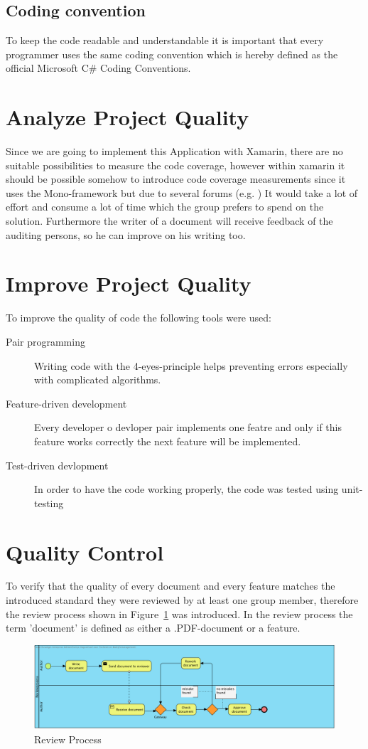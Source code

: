 \documentclass[12pt]{article}
\begin{document}
		\subsection{Coding convention}
		To keep the code readable and understandable it is important that every programmer uses the same coding convention which is hereby defined as the official Microsoft C\# Coding Conventions. \cite{Microsoft}
		
		\section{Analyze Project Quality}
		Since we are going to implement this Application with Xamarin, there are no suitable possibilities to measure the code coverage, however within xamarin it should be possible somehow to introduce code coverage measurements since it uses the Mono-framework but due to several forums (e.g. \cite{CodeCoverage}) It would take a lot of effort and consume a lot of time which the group prefers to spend on the solution. Furthermore the writer of a document will receive feedback of the auditing persons, so he can improve on his writing too.
		\clearpage
		\section{Improve Project Quality}
		To improve the quality of code the following tools were used:
		\begin{description}
			\item[Pair programming] Writing code with the 4-eyes-principle helps preventing errors especially with complicated algorithms.
			\item[Feature-driven development] Every developer o devloper pair implements one featre and only if this feature works correctly the next feature will be implemented.
			\item[Test-driven devlopment] In order to have the code working properly, the code was tested using unit-testing
		\end{description}
		\clearpage
		\section{Quality Control}
		To verify that the quality of every document and every feature matches the introduced standard they were reviewed by at least one group member, therefore the review process shown in Figure~\ref{reviewProcess} was introduced. In the review process the term 'document' is defined as either a .PDF-document or a feature.
		\begin{figure}[htpb]
			\minipage{\textwidth}
			\includegraphics[width=\linewidth, keepaspectratio=true]{./img/CheckQuality.png}
			\caption{Review Process}\label{reviewProcess}
			\endminipage\hfill
		\end{figure}
		\clearpage

\end{document}
